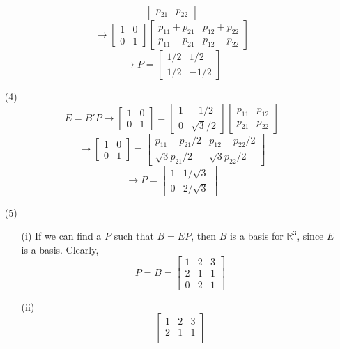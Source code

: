 \begin{itemize}
$$\begin{bmatrix}
p_{21} & p_{22}
\end{bmatrix}$$
$$\rightarrow \begin{bmatrix}
1 & 0 \\
0 & 1
\end{bmatrix}\begin{bmatrix}
p_{11} + p_{21} & p_{12} + p_{22} \\
p_{11} - p_{21} & p_{12} - p_{22}
\end{bmatrix}$$
$$\rightarrow P = \begin{bmatrix}
1/2 & 1/2 \\
1/2 & -1/2
\end{bmatrix}$$
\item[(4)]
$$E = B'P \rightarrow \begin{bmatrix}
1 & 0 \\
0 & 1
\end{bmatrix} = \begin{bmatrix}
1 & -1/2 \\
0 & \sqrt{3}/2
\end{bmatrix}\begin{bmatrix}
p_{11} & p_{12} \\
p_{21} & p_{22}
\end{bmatrix}$$
$$\rightarrow \begin{bmatrix}
1 & 0 \\
0 & 1
\end{bmatrix} = \begin{bmatrix}
p_{11} - p_{21}/2 & p_{12} - p_{22}/2 \\
\sqrt{3}p_{21}/2 & \sqrt{3}p_{22}/2
\end{bmatrix}$$
$$\rightarrow P = \begin{bmatrix}
1 & 1/\sqrt{3} \\
0 & 2/\sqrt{3}
\end{bmatrix}$$
\item[(5)]
\begin{itemize}
\item[(i)]
If we can find a $P$ such that $B = EP$, then $B$ is a basis for $\mathbb{R}^3$, since $E$ is a basis. Clearly, $$P = B = \begin{bmatrix}
1 & 2 & 3 \\
2 & 1 & 1 \\
0 & 2 & 1
\end{bmatrix}$$
\item[(ii)]
$$ \begin{bmatrix}
1 & 2 & 3 \\
2 & 1 & 1 \\

\end{bmatrix}$$
\end{itemize}
\end{itemize}

